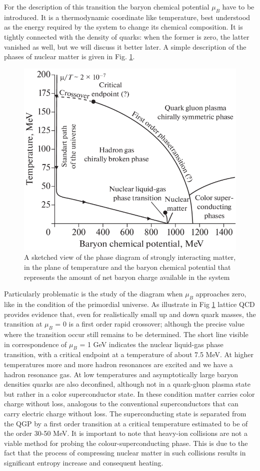 \documentclass[12pt,a4paper]{book}
\begin{document}
    For the description of this transition the baryon chemical potential $\mu_B$ have to be introduced. It is a thermodynamic coordinate like temperature, best understood as the energy required by the system to change its chemical composition. It is tightly connected with the density of quarks: when the former is zero, the latter vanished as well, but we will discuss it better later. A simple description of the phases of nuclear matter is given in Fig. \ref{fig:QCD_phase_diagram}. 
	\begin{figure}[ht]
		\centering
		\includegraphics[width=0.7\linewidth]{pictures/QCD_phase_diagram.png}
		\caption{A sketched view of the phase diagram of strongly interacting matter, in the plane of temperature and the baryon chemical potential that represents the amount of net baryon charge available in the system \cite{PhysRevD.101.103007}}
		\label{fig:QCD_phase_diagram} 
	\end{figure}
	Particularly problematic is the study of the diagram when $\mu_B$ approaches zero, like in the condition of the primordial universe. As illustrate in Fig \ref{fig:QCD_phase_diagram} lattice QCD provides evidence that, even for realistically small up and down quark masses, the transition at $\mu_B$ = 0 is a first order rapid crossover; although the precise value where the transition occur still remains to be determined. The short line visible in correspondence of $\mu_B$ = 1 GeV indicates the nuclear liquid-gas phase transition, with a critical endpoint at a temperature of about 7.5 MeV. At higher temperatures more and more hadron resonances are excited and we have a hadron resonance gas.
	At low temperatures and asymptotically large baryon densities quarks are also deconfined, although not in a quark-gluon plasma state but rather in a color superconductor state. In these condition matter carries color charge without loss, analogous to the conventional superconductors that can carry electric charge without loss. The superconducting state is separated from the QGP by a first order transition at a critical temperature estimated to be of the order 30-50 MeV. It is important to note that heavy-ion collisions are not a viable method for probing the colour-superconducting phase. This is due to the fact that the process of compressing nuclear matter in such collisions results in significant entropy increase and consequent heating.
	
\end{document}
